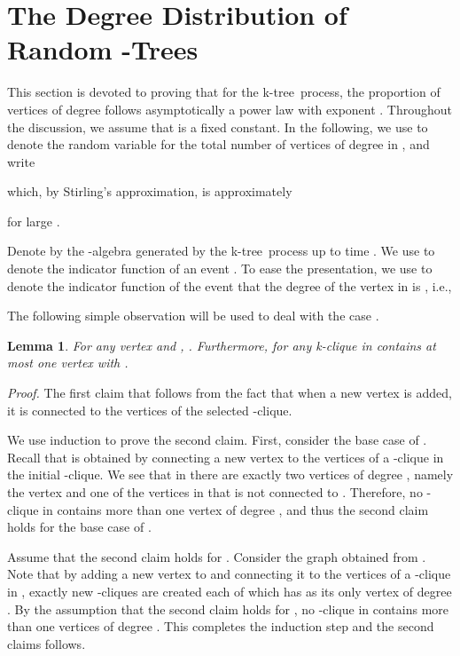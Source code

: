 \documentclass[11pt]{article}
\newtheorem{lemma}{Lemma}[section]
\newenvironment{proof}[0]{\textit{Proof.} }{\hfill   }
\providecommand{\ktree}{k-tree}
\begin{document}
\section{The Degree Distribution of Random -Trees}
This section is devoted to proving that for the \ktree\ process, the proportion of vertices of degree  follows asymptotically
a power law  with  exponent .  Throughout the discussion, we assume that
 is a fixed constant. 
In the following, we use  to denote the random variable for the total number
of vertices of degree  in , and write    

which, by Stirling's approximation, is approximately

for large .

Denote by 
the -algebra generated by the \ktree\ process up to time . 
We use  to denote the indicator function of an event . To ease the presentation, we 
use  to denote the indicator function of the event that the degree of the vertex 
 in  is , i.e.,


The following simple observation will be used to deal with the case .
\begin{lemma}
\label{lem:base}
For any vertex  and , . Furthermore, for 
any k-clique in  contains at most one vertex with .
\end{lemma}
\begin{proof}
The first claim that  follows from the fact that when a new vertex is added, 
it is connected to the  vertices of the selected -clique.  

We use induction to prove the second claim. First, consider the base case of . Recall that  
is obtained by connecting a new vertex  to the vertices of a -clique 
in the initial -clique. We see that in  there are exactly two vertices of degree , namely
the vertex  and one of the vertices in  that is not connected to .
Therefore, no -clique in  contains more than one vertex of degree , and thus the second claim 
holds for the base case of . 

Assume that the second claim holds for . Consider the graph  obtained from . 
Note that by adding a new vertex  to  and connecting it to the vertices of a -clique in 
, exactly  new -cliques are created each of which has  as its only vertex of degree . By the assumption that the second claim holds for ,  
no -clique in  contains more than one
vertices of degree . This completes the induction step and the second claims follows.             
\end{proof}
\end{document}
